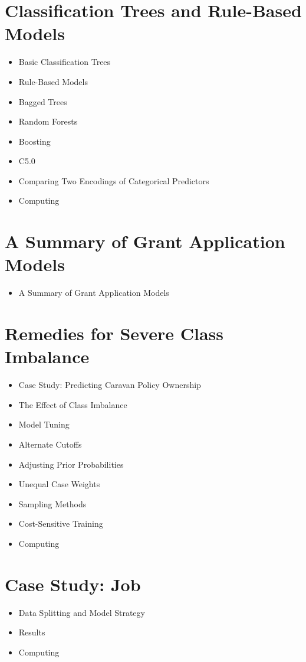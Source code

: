 \section{Classification Trees and Rule-Based Models}
\begin{itemize}  
\item Basic Classification Trees 
\item Rule-Based Models  
\item Bagged Trees 
\item Random Forests 
\item Boosting  
\item C5.0 
\item Comparing Two Encodings of Categorical Predictors 
\item Computing 
\end{itemize} 
\section{A Summary of Grant Application Models}
\begin{itemize}
\item A Summary of Grant Application Models
\end{itemize}

\section{Remedies for Severe Class Imbalance}  
\begin{itemize}
\item Case Study: Predicting Caravan Policy Ownership 
\item The Effect of Class Imbalance 
\item Model Tuning 
\item Alternate Cutoffs  
\item Adjusting Prior Probabilities  
\item Unequal Case Weights 
\item Sampling Methods  
\item Cost-Sensitive Training 
\item Computing 
\end{itemize} 
\section{Case Study: Job} 
\begin{itemize}
\item Data Splitting and Model Strategy  
\item Results 
\item Computing
\end{itemize} 
